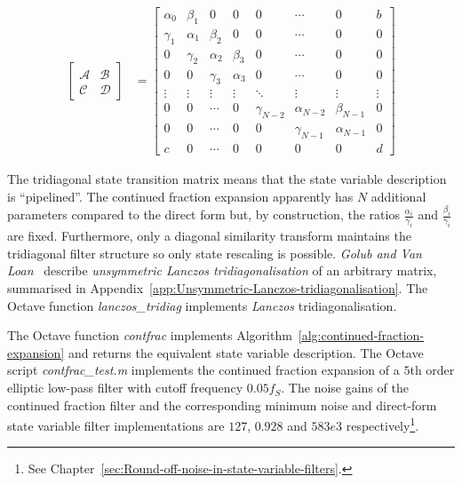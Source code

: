 \documentclass[a4paper,twoside,10pt,english]{report}
\begin{document}
\begin{align*}
\left[\begin{array}{cc}
\mathcal{A} & \mathcal{B} \\
\mathcal{C} & \mathcal{D}
\end{array}\right] 
&=
\left[\begin{array}{ccccccc|c}
\alpha_{0} & \beta_{1}  & 0          & 0          & 0        & \cdots & 0 & b \\
\gamma_{1} & \alpha_{1} & \beta_{2}   & 0          & 0        & \cdots & 0 & 0 \\
0         & \gamma_{2}  & \alpha_{2} & \beta_{3}   & 0        & \cdots & 0 & 0 \\
0         & 0          & \gamma_{3}  & \alpha_{3}  & 0       & \cdots & 0 & 0 \\
\vdots & \vdots & \vdots & \vdots & \ddots & \vdots & \vdots & \vdots \\
0        & 0 & \cdots  & 0 & \gamma_{N-2} & \alpha_{N-2} & \beta_{N-1} & 0 \\
0         & 0  & \cdots & 0 & 0 & \gamma_{N-1} & \alpha_{N-1} & 0 \\ \hline 
c & 0 & \cdots & 0 & 0 & 0 & 0 & d
\end{array}\right] 
\end{align*}

The tridiagonal state transition matrix means that the state variable 
description is ``pipelined''. The continued fraction expansion apparently has
$N$ additional parameters compared to the direct form but, by construction, 
the ratios $\frac{\alpha_{i}}{\gamma_{i}}$ and $\frac{\beta_{i}}{\gamma_{i}}$ 
are fixed. Furthermore, only a diagonal similarity transform maintains the 
tridiagonal filter structure so only state rescaling is possible.
\emph{Golub and Van Loan}~\cite[Section 9.4.3]{GolubVanLoan_MatrixComputations}
describe \emph{unsymmetric Lanczos tridiagonalisation} of an arbitrary matrix,
summarised in Appendix~\ref{app:Unsymmetric-Lanczos-tridiagonalisation}. The
Octave function \emph{lanczos\_tridiag} implements \emph{Lanczos}
tridiagonalisation.

The Octave function \emph{contfrac} implements 
Algorithm~\ref{alg:continued-fraction-expansion} and returns the equivalent 
state variable description. The Octave script \emph{contfrac\_test.m} implements
the continued fraction expansion of a $5$th order elliptic low-pass filter with
cutoff frequency $0.05f_{S}$. The noise gains of the continued fraction filter
and the corresponding minimum noise and direct-form state variable filter
implementations are $127$, $0.928$ and $583e3$ respectively\footnote{See
  Chapter~\ref{sec:Round-off-noise-in-state-variable-filters}.}.
\cleardoublepage{}
\end{document}
